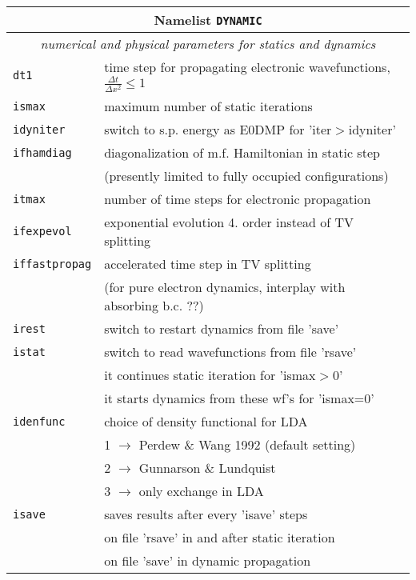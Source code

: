 \documentclass[12pt]{article}
\begin{document}
\newpage

\begin{tabular}{ll}
\hline
\multicolumn{2}{c}{Namelist {\tt DYNAMIC}} in {\tt for005.<name>} \\
\hline
\multicolumn{2}{c}{\it numerical and physical parameters for statics and dynamics} \\
\hline
{\tt dt1              }& time step for propagating electronic wavefunctions,  $\frac{\Delta t}{\Delta x^{2}}\leq 1$\\
{\tt ismax            }& maximum number of static iterations \\
{\tt idyniter         }& switch to s.p. energy as E0DMP for 'iter$>$idyniter'\\
{\tt ifhamdiag} & diagonalization of m.f. Hamiltonian in static step\\
& (presently limited to fully occupied configurations)\\
{\tt itmax            }& number of time steps for electronic propagation\\
{\tt ifexpevol} & exponential evolution 4. order instead of TV splitting\\
{\tt iffastpropag} & accelerated time step in TV splitting\\
  & (for pure electron dynamics, interplay with absorbing b.c. ??)\\
{\tt irest            }& switch to restart dynamics from file 'save'\\
{\tt istat            }& switch to read wavefunctions from file 'rsave'\\
{\tt } &\hspace*{1em}it continues static iteration for 'ismax$>$0' \\
{\tt } &\hspace*{1em}it starts dynamics from these wf's for 'ismax=0' \\
{\tt idenfunc} & choice of density functional for LDA\\
               & 1 $\rightarrow$ Perdew \& Wang 1992 (default setting)\\
               & 2 $\rightarrow$ Gunnarson \& Lundquist\\
               & 3  $\rightarrow$ only exchange in  LDA \\
{\tt isave            }& saves results after every 'isave' steps \\
{\tt                  }& on file 'rsave' in and after static iteration\\
{\tt                  }& on file 'save' in dynamic propagation\\

\end{tabular}
\end{document}
